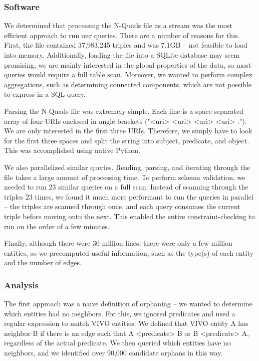 \documentclass[11pt]{article}
\begin{document}
\subsubsection*{Software}
We determined that processing the N-Quads file as a stream was the most efficient approach to run our queries. There are a number of reasons for this. First, the file contained 37,983,245 triples and was 7.1GB -- not feasible to load into memory. Additionally, loading the file into a SQLite database may seem promising, we are mainly interested in the global properties of the data, so most queries would require a full table scan. Moreover, we wanted to perform complex aggregations, such as determining connected components, which are not possible to express in a SQL query.

Parsing the N-Quads file was extremely simple. Each line is a space-separated array of four URIs enclosed in angle brackets ("<uri> <uri> <uri> <uri> ."). We are only interested in the first three URIs. Therefore, we simply have to look for the first three spaces and split the string into subject, predicate, and object. This was accomplished using native Python.

We also parallelized similar queries. Reading, parsing, and iterating through the file takes a large amount of processing time. To perform schema validation, we needed to run 23 similar queries on a full scan. Instead of scanning through the triples 23 times, we found it much more performant to run the queries in parallel -- the triples are scanned through once, and each query consumes the current triple before moving onto the next. This enabled the entire constraint-checking to run on the order of a few minutes.

Finally, although there were 30 million lines, there were only a few million entities, so we precomputed useful information, such as the type(s) of each entity and the number of edges.

\subsubsection*{Analysis}
The first approach was a naive definition of orphaning -- we wanted to determine which entities had no neighbors. For this, we ignored predicates and used a regular expression to match VIVO entities. We defined that VIVO entity A has neighbor B if there is an edge such that A <predicate> B or B <predicate> A, regardless of the actual predicate. We then queried which entities have no neighbors, and we identified over 90,000 candidate orphans in this way.
\end{document}
